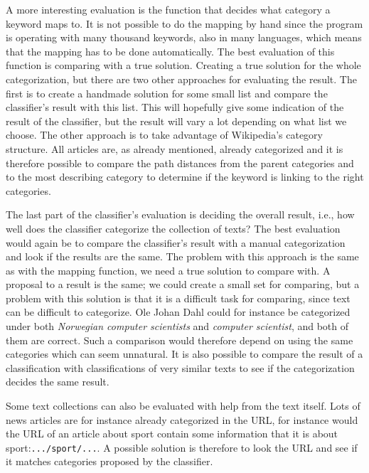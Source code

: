 A more interesting evaluation is the function that decides what category a keyword maps to. It is not possible to do the mapping by hand since the program is operating with many thousand keywords, also in many languages, which means that the mapping has to be done automatically. The best evaluation of this function is comparing with  a true solution. Creating a true solution for the whole categorization, but there are two other approaches for evaluating the result. The first is to create a handmade solution for some small list and compare the classifier's result with this list. This will hopefully give some indication of the result of the classifier, but the result will vary a lot depending on what list we choose. 
The other approach is to take advantage of Wikipedia's category structure. 
%
All articles are, as already mentioned, already categorized and it is therefore possible to compare the path 
distances from the parent categories and to the most describing category to determine if the keyword is linking to the right categories.


The last part of the classifier's evaluation is deciding the overall result, i.e., how well does the classifier categorize the collection of texts? The best evaluation would again be to compare the classifier's result with a manual categorization and look if the results are the same. The problem with this approach is the same as with the mapping function, we need a true solution to compare with. A proposal to a result is the same; we could create a small set for comparing, but a problem with this solution is that it is a difficult task for comparing, since text can be difficult to categorize. Ole Johan Dahl could for instance be categorized under both \textit{Norwegian computer scientists} and \textit{computer scientist}, and both of them are correct. Such a comparison would therefore depend on using the same categories which can seem unnatural. It is also possible to compare the result of a classification with classifications of very similar texts to see if the categorization decides the same result. 

Some text collections can also be evaluated with help from the text itself. Lots of news articles are for instance already categorized in the URL, for instance would the URL of an article about sport contain  some information that it is about sport:\texttt{.../sport/...}. A possible solution is therefore to look the URL and see if it matches categories proposed by the classifier. 
